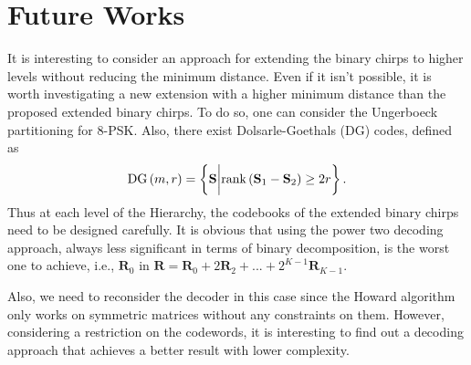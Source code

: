 \documentclass[lettersize,journal,onecolumn]{IEEEtran}
\begin{document}
\section*{Future Works}
It is interesting to consider an approach for extending the binary chirps to higher levels without reducing the minimum distance. Even if it isn't possible, it is worth investigating a new extension with a higher minimum distance than the proposed extended binary chirps. To do so, one can consider the Ungerboeck partitioning for 8-PSK. Also, there exist Dolsarle-Goethals (DG) codes, defined as
\begin{equation}
	\text{DG}\left(m,r\right) = \left\{\mathbf{S} \bigg{|} \text{rank}\left(\mathbf{S}_1-\mathbf{S}_2\right) \ge 2r   \right\}.
\end{equation} 
Thus at each level of the Hierarchy, the codebooks of the extended binary chirps need to be designed carefully. It is obvious that using the power two decoding approach, always less significant in terms of binary decomposition, is the worst one to achieve, i.e.,  $\mathbf{R}_0$ in $\mathbf{R}=\mathbf{R}_0+2\mathbf{R}_2+...+2^{K-1}\mathbf{R}_{K-1}$. 

Also, we need to reconsider the decoder in this case since the Howard algorithm only works on symmetric matrices without any constraints on them. However, considering a restriction on the codewords, it is interesting to find out a decoding approach that achieves a better result with lower complexity.



{\footnotesize 
}
\end{document}
